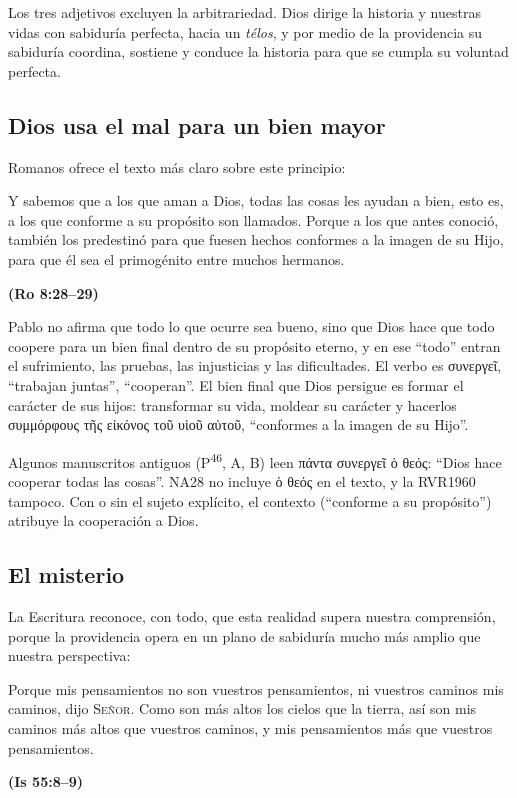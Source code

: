 \documentclass[11pt,letterpaper]{article}
\newcommand{\grc}[1]{\foreignlanguage{ancientgreek}{#1}}
\newcommand{\SENOR}{\textsc{Señor}}
\newcommand{\fuente}[1]{\par\hfill{\upshape\bfseries\small\textcolor{azul}{#1}}}
\begin{document}
Los tres adjetivos excluyen la arbitrariedad. Dios dirige la historia y nuestras vidas con sabiduría perfecta, hacia un \emph{télos}, y por medio de la providencia su sabiduría coordina, sostiene y conduce la historia para que se cumpla su voluntad perfecta.

\subsection{Dios usa el mal para un bien mayor}

Romanos ofrece el texto más claro sobre este principio:

\begin{cita}Y sabemos que a los que aman a Dios, todas las cosas les ayudan a bien, esto es, a los que conforme a su propósito son llamados. Porque a los que antes conoció, también los predestinó para que fuesen hechos conformes a la imagen de su Hijo, para que él sea el primogénito entre muchos hermanos.\fuente{(Ro 8:28--29)}\end{cita}

Pablo no afirma que todo lo que ocurre sea bueno, sino que Dios hace que todo coopere para un bien final dentro de su propósito eterno, y en ese ``todo'' entran el sufrimiento, las pruebas, las injusticias y las dificultades. El verbo es \grc{συνεργεῖ}, ``trabajan juntas'', ``cooperan''. El bien final que Dios persigue es formar el carácter de sus hijos: transformar su vida, moldear su carácter y hacerlos \grc{συμμόρφους τῆς εἰκόνος τοῦ υἱοῦ αὐτοῦ}, ``conformes a la imagen de su Hijo''.

\begin{nota}
Algunos manuscritos antiguos (P\textsuperscript{46}, A, B) leen \grc{πάντα συνεργεῖ ὁ θεός}: ``Dios hace cooperar todas las cosas''. NA28 no incluye \grc{ὁ θεός} en el texto, y la RVR1960 tampoco. Con o sin el sujeto explícito, el contexto (``conforme a su propósito'') atribuye la cooperación a Dios.
\end{nota}

\subsection{El misterio}

La Escritura reconoce, con todo, que esta realidad supera nuestra comprensión, porque la providencia opera en un plano de sabiduría mucho más amplio que nuestra perspectiva:

\begin{cita}Porque mis pensamientos no son vuestros pensamientos, ni vuestros caminos mis caminos, dijo \SENOR. Como son más altos los cielos que la tierra, así son mis caminos más altos que vuestros caminos, y mis pensamientos más que vuestros pensamientos.\fuente{(Is 55:8--9)}\end{cita}
\end{document}
